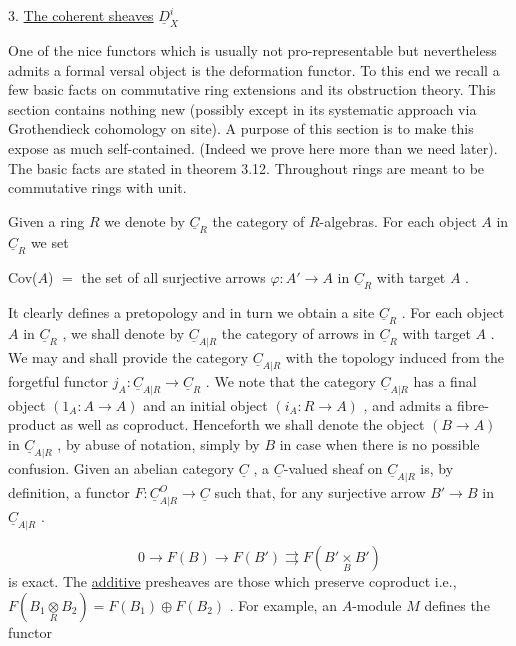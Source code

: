 3.  \underline{The coherent sheaves}  $\underline{D}^i_X$

One of the nice functors which is usually not pro-representable but nevertheless admits a formal versal object is the deformation functor. To this end we recall a few basic facts on commutative ring extensions and its obstruction theory. This section contains nothing new (possibly except in its systematic approach via Grothendieck cohomology on site). A purpose of this section is to make this expose as much self-contained. (Indeed we prove here more than we need later). The basic facts are stated in theorem 3.12. Throughout rings are meant to be commutative rings with unit.



Given a ring  $R$  we denote by  $\underline{C}_R$  the category of $R$-algebras. For each object  $A$  in  $\underline{C}_R$  we set

Cov($A$) $=$ the set of all surjective arrows  $\varphi : A' \to A$  in  $\underline{C}_R$  with target  $A$ .

It clearly defines a pretopology and in turn we obtain a site  $\underline{C}_R$ . For each object  $A$  in  $\underline{C}_R$ , we shall denote by  $\underline{C}_{A|R}$  the category of arrows in  $\underline{C}_R$  with target  $A$ . We may and shall provide the category  $\underline{C}_{A|R}$  with the topology induced from the forgetful functor  $j_A : \underline{C}_{A|R} \to \underline{C}_R$ . We note that the category  $\underline{C}_{A|R}$  has a final object  $(1_A : A \to A)$  and an initial object  $(i_A : R \to A)$ , and admits a fibre-product as well as coproduct. Henceforth we shall denote the object  $(B \to A)$  in  $\underline{C}_{A|R}$ , by abuse of notation, simply by  $B$  in case when there is no possible confusion. Given an abelian category  $\underline{C}$ , a  $\underline{C}$-valued sheaf on  $\underline{C}_{A|R}$  is, by definition, a functor  $F : \underline{C}^{O}_{A|R} \to \underline{C}$  such that, for any surjective arrow  $B' \to B$  in  $\underline{C}_{A|R}$ .

\begin{equation*}
0 \to F(B) \to F(B') \rightrightarrows F(B' \underset{B}{\times} B')
\end{equation*}
is exact. The  \underline{additive}  presheaves are those which preserve coproduct i.e.,  $F(B_1 \underset{R}{\otimes} B_2) = F(B_1) \oplus F(B_2)$ . For example, an $A$-module  $M$  defines the functor

